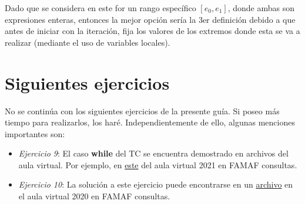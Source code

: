\documentclass{article}
\begin{document}
Dado que se considera en este for un rango específico $[e_0, e_1]$, donde ambas son expresiones enteras, entonces la mejor opción sería la 3er definición debido a que antes de iniciar con la iteración, fija los valores de los extremos donde esta se va a realizar (mediante el uso de variables locales).

\section*{Siguientes ejercicios}
No se continúa con los siguientes ejercicios de la presente guía.
Si poseo más tiempo para realizarlos, los haré.
Independientemente de ello, algunas menciones importantes son:
\begin{itemize}
  \item \textit{Ejercicio 9}: El caso \textbf{while} del TC se encuentra demostrado en archivos del aula virtual.
                 Por ejemplo, en \href{https://famaf-consultas.aulavirtual.unc.edu.ar/pluginfile.php/123179/mod_folder/content/0/TCwhile.pdf?forcedownload=1}{este} del aula virtual 2021 en FAMAF consultas.
  \item \textit{Ejercicio 10}: La solución a este ejercicio puede encontrarse en un \href{https://famaf-consultas.aulavirtual.unc.edu.ar/pluginfile.php/61374/mod_resource/content/2/P4E10.pdf}{archivo} en el aula virtual 2020 en FAMAF consultas.
\end{itemize}
\end{document}
